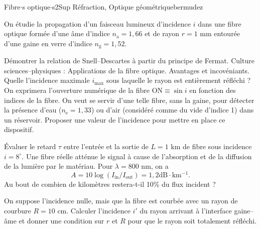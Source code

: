 \begin{exercise}{Fibre$\cdot$s optique$\cdot$s}{2}{Sup}
{Réfraction, Optique géométrique}{bermudez}

On étudie la propagation d'un faisceau lumineux d'incidence $i$ dans une fibre optique formée d’une âme d’indice $n_\text{a} = 1,66$ et de rayon $r = 1$ mm entourée d’une gaine en verre d’indice $n_\text{g} = 1,52$.

\begin{figure}[H]
\centering
\end{figure}

\begin{questions}
    \questioncours Démontrer la relation de Snell--Descartes à partir du principe de Fermat.
    \question \textsf{Culture sciences--physiques :} Applications de la fibre optique. Avantages et incovéniants.
    \question Quelle l'incidence maximale $i_\text{max}$ sous laquelle le rayon est entièrement réfléchi ? On exprimera l'ouverture numérique de la fibre $\text{ON} \equiv \sin i$ en fonction des indices de la fibre.
    \question On veut se servir d'une telle fibre, sans la gaine, pour détecter la présence d'eau ($n_\text{e} = 1,33$) ou d'air (considéré comme du vide d'indice 1) dans un réservoir.
    Proposer une valeur de l'incidence pour mettre en place ce dispositif.
    
    \question Évaluer le retard $\tau$ entre l'entrée et la sortie de $L = 1$ km de fibre sous incidence $i = 8^\circ$.
    \question Une fibre réelle atténue le signal à cause de l'absorption et de la diffusion de la lumière par le matériau. Pour $\lambda = 800$ nm, on a
    $$A = 10\log(I_\text{in}/I_\text{out}) = 1,2 \mathrm{ dB\cdot km^{-1}}.$$
    Au bout de combien de kilomètres restera-t-il 10\% du flux incident ?
    
    \question On suppose l'incidence nulle, mais que la fibre est courbée avec un rayon de courbure $R = 10$ cm. Calculer l'incidence $i'$ du rayon arrivant à l'interface gaine--âme et donner une condition sur $r$ et $R$ pour que le rayon soit totalement réfléchi.
\end{questions}

\end{exercise}
